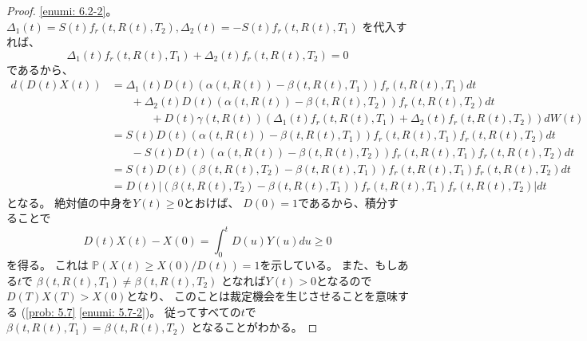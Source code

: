 \documentclass[uplatex]{jsarticle}
\theoremstyle{definition}
\def\P{\mathbb{P}}
\begin{document}
\begin{proof}
  \ref{enumi: 6.2-2}。
  \(\Delta_1(t) = S(t)f_r(t,R(t),T_2),
  \Delta_2(t) = - S(t)f_r(t,R(t),T_1)\)
  を代入すれば、
  \[\Delta_1(t)f_r(t,R(t),T_1) + \Delta_2(t)f_r(t,R(t),T_2) = 0\]
  であるから、
  \begin{align*}
    d(D(t)X(t))
    &= \Delta_1(t)D(t)\left( \alpha(t,R(t))
    - \beta(t,R(t),T_1)\right)f_r(t,R(t),T_1) dt \\
    &\ \ \ \ \ \ \ \
    + \Delta_2(t)D(t)\left( \alpha(t,R(t))
    - \beta(t,R(t),T_2)\right)f_r(t,R(t),T_2)dt \\
    &\ \ \ \ \ \ \ \ \ \ \ \ \ \ \ \
    + D(t)\gamma(t,R(t))\left( \Delta_1(t)f_r(t,R(t),T_1)
    + \Delta_2(t)f_r(t,R(t),T_2) \right) dW(t) \\
    &= S(t)D(t)\left( \alpha(t,R(t))
    - \beta(t,R(t),T_1)\right)f_r(t,R(t),T_1)f_r(t,R(t),T_2) dt \\
    &\ \ \ \ \ \ \ \
    - S(t)D(t)\left( \alpha(t,R(t))
    - \beta(t,R(t),T_2)\right)f_r(t,R(t),T_1)f_r(t,R(t),T_2)dt \\
    &= S(t)D(t)\left( \beta(t,R(t),T_2) - \beta(t,R(t),T_1)
    \right)f_r(t,R(t),T_1)f_r(t,R(t),T_2) dt \\
    &= D(t)\left| \left(\beta(t,R(t),T_2) - \beta(t,R(t),T_1)
    \right)f_r(t,R(t),T_1)f_r(t,R(t),T_2)\right| dt
  \end{align*}
  となる。
  絶対値の中身を\(Y(t) \geq 0\)とおけば、
  \(D(0) = 1\)であるから、積分することで
  \[
  D(t)X(t) - X(0) = \int_0^tD(u)Y(u)du \geq 0
  \]
  を得る。
  これは
  \(\P(X(t) \geq X(0)/D(t)) = 1\)を示している。
  また、もしある\(t\)で
  \(\beta(t,R(t),T_1) \neq \beta(t,R(t),T_2)\)
  となれば\(Y(t) > 0\)となるので
  \(D(T)X(T) > X(0)\)となり、
  このことは裁定機会を生じさせることを意味する
  (\autoref{prob: 5.7} \ref{enumi: 5.7-2})。
  従ってすべての\(t\)で
  \(\beta(t,R(t),T_1) = \beta(t,R(t),T_2)\)
  となることがわかる。


\end{proof}
\end{document}
